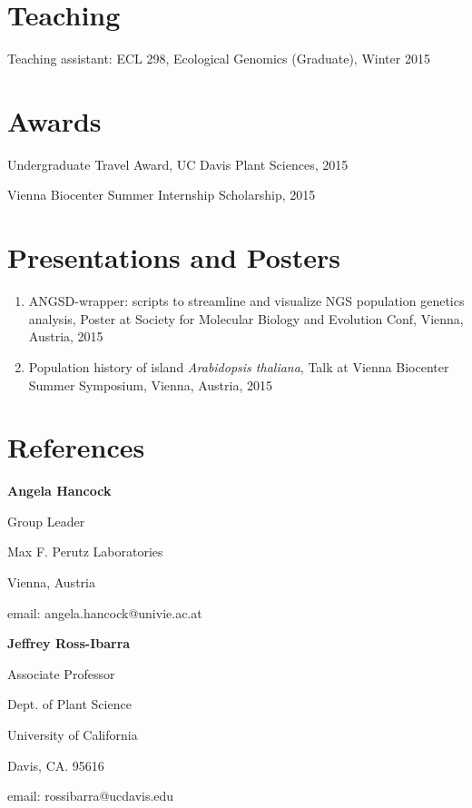 \documentclass[letterpaper]{article}
\renewenvironment{itemize}{
  \begin{list}{}{
    \setlength{\leftmargin}{1em}
  }
}{
  \end{list}
}
\begin{document}
\setlength\parskip{0em}

\section*{Teaching}
\begin{itemize}
\item Teaching assistant: ECL 298, Ecological Genomics (Graduate), Winter 2015
\end{itemize}

\section*{Awards}
\begin{itemize}
\item Undergraduate Travel Award, UC Davis Plant Sciences, 2015
\item Vienna Biocenter Summer Internship Scholarship, 2015
\end{itemize}

\setlength\parskip{0.15em}
\section*{Presentations and Posters}
\begin{enumerate}[leftmargin=!,labelindent=5pt,itemindent=-15pt]
\item ANGSD-wrapper: scripts to streamline and visualize NGS population genetics analysis, Poster at Society for Molecular Biology and Evolution Conf, Vienna, Austria, 2015
\item Population history of island {\it Arabidopsis thaliana}, Talk at Vienna Biocenter Summer Symposium, Vienna, Austria, 2015
\end{enumerate}

\setlength\parskip{0.5em}
\section*{References}
\begin{itemize}
	\item {\bf Angela Hancock}
	\item Group Leader
	\item Max F. Perutz Laboratories
	\item Vienna, Austria
	\item email: angela.hancock@univie.ac.at 
	\item {\bf Jeffrey Ross-Ibarra}
	\item Associate Professor
	\item Dept. of Plant Science
	\item University of California
	\item Davis, CA. 95616
	\item email: rossibarra@ucdavis.edu 
\end{itemize}
\end{document}
